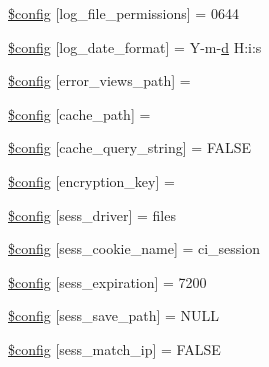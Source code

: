 \begin{DoxyCompactItemize}
\item 
\hyperlink{application_2config_2config_8php_adda49cab39a767472dca528204e5753b}{\$config} \mbox{[}\textquotesingle{}log\+\_\+file\+\_\+permissions\textquotesingle{}\mbox{]} = 0644
\item 
\hyperlink{application_2config_2config_8php_a9cc05811c32c13c55ed407435a3a31b6}{\$config} \mbox{[}\textquotesingle{}log\+\_\+date\+\_\+format\textquotesingle{}\mbox{]} = \textquotesingle{}Y-\/m-\/\hyperlink{jquery_8canvasjs_8min_8js_a36541169dfff685f807208881a4f0021}{d} H\+:i\+:s\textquotesingle{}
\item 
\hyperlink{application_2config_2config_8php_a3e989981477279a1389c9295c4a5f324}{\$config} \mbox{[}\textquotesingle{}error\+\_\+views\+\_\+path\textquotesingle{}\mbox{]} = \textquotesingle{}\textquotesingle{}
\item 
\hyperlink{application_2config_2config_8php_ae3a5dd52b4d040adb6461b9a17d1e0f0}{\$config} \mbox{[}\textquotesingle{}cache\+\_\+path\textquotesingle{}\mbox{]} = \textquotesingle{}\textquotesingle{}
\item 
\hyperlink{application_2config_2config_8php_ae6508d6fa180ae0a584d6ccb03189372}{\$config} \mbox{[}\textquotesingle{}cache\+\_\+query\+\_\+string\textquotesingle{}\mbox{]} = F\+A\+L\+S\+E
\item 
\hyperlink{application_2config_2config_8php_aefa5c9d6e7a454a6218df87e65796357}{\$config} \mbox{[}\textquotesingle{}encryption\+\_\+key\textquotesingle{}\mbox{]} = \textquotesingle{}\textquotesingle{}
\item 
\hyperlink{application_2config_2config_8php_afcd06246e5564eb457c8959af88c34f1}{\$config} \mbox{[}\textquotesingle{}sess\+\_\+driver\textquotesingle{}\mbox{]} = \textquotesingle{}files\textquotesingle{}
\item 
\hyperlink{application_2config_2config_8php_acaf9fb6347a03527f4b04198d6d8155b}{\$config} \mbox{[}\textquotesingle{}sess\+\_\+cookie\+\_\+name\textquotesingle{}\mbox{]} = \textquotesingle{}ci\+\_\+session\textquotesingle{}
\item 
\hyperlink{application_2config_2config_8php_ad6a3784cad81991936465dcdac74b66a}{\$config} \mbox{[}\textquotesingle{}sess\+\_\+expiration\textquotesingle{}\mbox{]} = 7200
\item 
\hyperlink{application_2config_2config_8php_ac1db0aa8bd0457f694fdaa99cc7878a1}{\$config} \mbox{[}\textquotesingle{}sess\+\_\+save\+\_\+path\textquotesingle{}\mbox{]} = N\+U\+L\+L
\item 
\hyperlink{application_2config_2config_8php_aed449d12f2854249e5f7229fafb269b2}{\$config} \mbox{[}\textquotesingle{}sess\+\_\+match\+\_\+ip\textquotesingle{}\mbox{]} = F\+A\+L\+S\+E

\end{DoxyCompactItemize}

